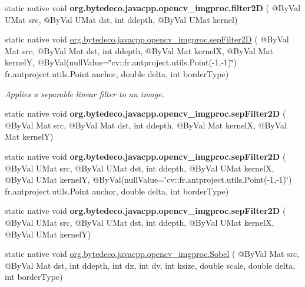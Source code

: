 \begin{DoxyCompactItemize}
\item 
\mbox{\label{group__imgproc__filter_gab00b34dd987b71bf76d7106f14642f4e}} 
static native void {\bfseries org.\+bytedeco.\+javacpp.\+opencv\+\_\+imgproc.\+filter2D} ( @By\+Val U\+Mat src, @By\+Val U\+Mat dst, int ddepth, @By\+Val U\+Mat kernel)
\item 
static native void \hyperlink{group__imgproc__filter_ga716654f3d25206913e265bf388fd83d0}{org.\+bytedeco.\+javacpp.\+opencv\+\_\+imgproc.\+sep\+Filter2D} ( @By\+Val Mat src, @By\+Val Mat dst, int ddepth, @By\+Val Mat kernelX, @By\+Val Mat kernelY, @By\+Val(null\+Value=\char`\"{}cv\+::\+fr.antproject.utils.Point(-\/1,-\/1)\char`\"{}) fr.antproject.utils.Point anchor, double delta, int border\+Type)
\begin{DoxyCompactList}\small\item\em Applies a separable linear filter to an image. \end{DoxyCompactList}\item 
\mbox{\label{group__imgproc__filter_gaf2d8d962ce153aab98ee6c5d0637c731}} 
static native void {\bfseries org.\+bytedeco.\+javacpp.\+opencv\+\_\+imgproc.\+sep\+Filter2D} ( @By\+Val Mat src, @By\+Val Mat dst, int ddepth, @By\+Val Mat kernelX, @By\+Val Mat kernelY)
\item 
\mbox{\label{group__imgproc__filter_ga2035b246fa133c96e4469b8566b7674b}} 
static native void {\bfseries org.\+bytedeco.\+javacpp.\+opencv\+\_\+imgproc.\+sep\+Filter2D} ( @By\+Val U\+Mat src, @By\+Val U\+Mat dst, int ddepth, @By\+Val U\+Mat kernelX, @By\+Val U\+Mat kernelY, @By\+Val(null\+Value=\char`\"{}cv\+::\+fr.antproject.utils.Point(-\/1,-\/1)\char`\"{}) fr.antproject.utils.Point anchor, double delta, int border\+Type)
\item 
\mbox{\label{group__imgproc__filter_ga0581b57344a84bf92ed8304a31c0d5ae}} 
static native void {\bfseries org.\+bytedeco.\+javacpp.\+opencv\+\_\+imgproc.\+sep\+Filter2D} ( @By\+Val U\+Mat src, @By\+Val U\+Mat dst, int ddepth, @By\+Val U\+Mat kernelX, @By\+Val U\+Mat kernelY)
\item 
static native void \hyperlink{group__imgproc__filter_ga99eaf057a0aad8f1ba5bc04ca0defe15}{org.\+bytedeco.\+javacpp.\+opencv\+\_\+imgproc.\+Sobel} ( @By\+Val Mat src, @By\+Val Mat dst, int ddepth, int dx, int dy, int ksize, double scale, double delta, int border\+Type)

\end{DoxyCompactItemize}
